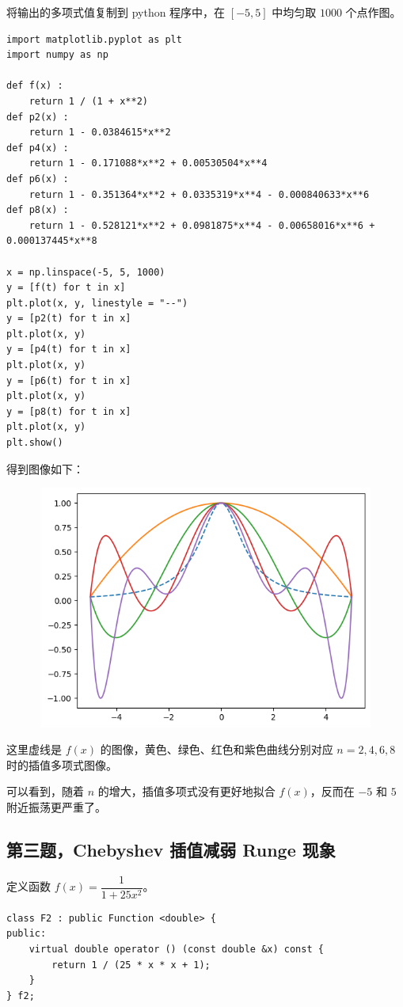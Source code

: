 \documentclass{ctexart}
\begin{document}
将输出的多项式值复制到 python 程序中，在 $[-5,5]$ 中均匀取 $1000$ 个点作图。

\begin{verbatim}
import matplotlib.pyplot as plt
import numpy as np

def f(x) :
    return 1 / (1 + x**2)
def p2(x) :
    return 1 - 0.0384615*x**2
def p4(x) :
    return 1 - 0.171088*x**2 + 0.00530504*x**4
def p6(x) :
    return 1 - 0.351364*x**2 + 0.0335319*x**4 - 0.000840633*x**6
def p8(x) :
    return 1 - 0.528121*x**2 + 0.0981875*x**4 - 0.00658016*x**6 + 0.000137445*x**8

x = np.linspace(-5, 5, 1000)
y = [f(t) for t in x]
plt.plot(x, y, linestyle = "--")
y = [p2(t) for t in x]
plt.plot(x, y)
y = [p4(t) for t in x]
plt.plot(x, y)
y = [p6(t) for t in x]
plt.plot(x, y)
y = [p8(t) for t in x]
plt.plot(x, y)
plt.show()
\end{verbatim}

得到图像如下：

\begin{figure}[h]
    \begin{minipage}{4cm}
	\includegraphics[width = 12cm, height = 8cm]{2.png}
	\label{fig1}
	\end{minipage}
\end{figure}

这里虚线是 $f(x)$ 的图像，黄色、绿色、红色和紫色曲线分别对应 $n=2,4,6,8$ 时的插值多项式图像。

可以看到，随着 $n$ 的增大，插值多项式没有更好地拟合 $f(x)$，反而在 $-5$ 和 $5$ 附近振荡更严重了。

\subsection{第三题，Chebyshev 插值减弱 Runge 现象}
定义函数 $f(x)=\dfrac 1{1+25x^2}$。
\begin{verbatim}
class F2 : public Function <double> {
public:
    virtual double operator () (const double &x) const {
        return 1 / (25 * x * x + 1);
    }
} f2;
\end{verbatim}
\end{document}

